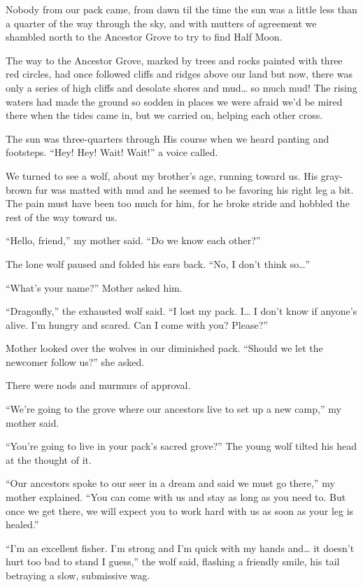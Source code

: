 \secdiv

\noindent Nobody from our pack came, from dawn til the time the sun was a little less than a quarter of the way through the sky, and with mutters of agreement we shambled north to the Ancestor Grove to try to find Half Moon.

The way to the Ancestor Grove, marked by trees and rocks painted with three red circles, had once followed cliffs and ridges above our land but now, there was only a series of high cliffs and desolate shores and mud\ldots{} so much mud! The rising waters had made the ground so sodden in places we were afraid we'd be mired there when the tides came in, but we carried on, helping each other cross.

The sun was three-quarters through His course when we heard panting and footsteps. ``Hey! Hey! Wait! Wait!'' a voice called.

We turned to see a wolf, about my brother's age, running toward us. His gray-brown fur was matted with mud and he seemed to be favoring his right leg a bit. The pain must have been too much for him, for he broke stride and hobbled the rest of the way toward us.

``Hello, friend,'' my mother said. ``Do we know each other?''

The lone wolf paused and folded his ears back. ``No, I don't think so\ldots''

``What's your name?'' Mother asked him.

``Dragonfly,'' the exhausted wolf said. ``I lost my pack. I\ldots{} I don't know if anyone's alive. I'm hungry and scared. Can I come with you? Please?''

Mother looked over the wolves in our diminished pack. ``Should we let the newcomer follow us?'' she asked.

There were nods and murmurs of approval.

``We're going to the grove where our ancestors live to set up a new camp,'' my mother said.

``You're going to live in your pack's sacred grove?'' The young wolf tilted his head at the thought of it.

``Our ancestors spoke to our seer in a dream and said we must go there,'' my mother explained. ``You can come with us and stay as long as you need to. But once we get there, we will expect you to work hard with us as soon as your leg is healed.''

``I'm an excellent fisher. I'm strong and I'm quick with my hands and\ldots{} it doesn't hurt too bad to stand I guess,'' the wolf said, flashing a friendly smile, his tail betraying a slow, submissive wag.

